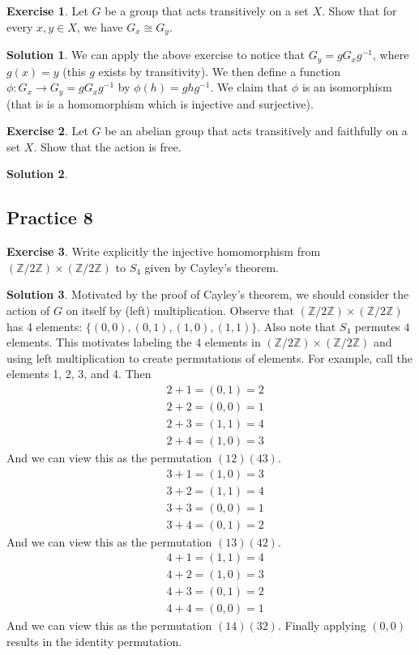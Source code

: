 \documentclass[12pt]{article}
\theoremstyle{definition}
\newcommand{\Z}{\mathbb{Z}}
\newtheorem{exercise}{\color{YellowOrange}Exercise}
\theoremstyle{definition}
\newtheorem{solution}{\color{Goldenrod}Solution}
\begin{document}
\begin{exercise}
	Let $G$ be a group that acts transitively on a set $X$. Show that for every $x,y \in X$, we have $G_x \cong G_y$. 
\end{exercise}
\begin{solution}
	We can apply the above exercise to notice that $G_y = gG_xg^{-1}$, where $g(x) = y$ (this $g$ exists by transitivity). We then define a function $\phi : G_x \to G_y = gG_xg^{-1}$ by $\phi(h) = ghg^{-1}$. We claim that $\phi$ is an isomorphism (that is is a homomorphism which is injective and surjective). 
\end{solution}

\begin{exercise}
Let $G$ be an abelian group that acts transitively and faithfully on a set $X$. Show that the action is free. 
\end{exercise}
\begin{solution}
\end{solution}

\subsection{Practice 8}
\begin{exercise}
	Write explicitly the injective homomorphism from $(\Z/2 \Z) \times (\Z/2 \Z)$ to $S_4$ given by Cayley's theorem. 
\end{exercise}
\begin{solution}
	Motivated by the proof of Cayley's theorem, we should consider the action of $G$ on itself by (left) multiplication. Observe that $(\Z/2 \Z) \times (\Z/2 \Z)$ has 4 elements: $\{(0,0),(0,1),(1,0),(1,1)\}$. Also note that $S_4$ permutes $4$ elements. This motivates labeling the $4$ elements in $(\Z/2 \Z) \times (\Z/2 \Z)$  and using left multiplication to create permutations of elements. For example, call the elements 1, 2, 3, and 4. Then
	\begin{align*}
	&2 + 1 = (0,1) = 2\\
	&2 + 2 = (0,0) = 1\\
	&2 + 3 = (1,1) = 4\\
	&2 + 4 = (1,0) = 3 
	\end{align*}
	And we can view this as the permutation $(12)(43)$.
	\begin{align*}
	&3 + 1 = (1,0) = 3\\
	&3 + 2 = (1,1) = 4\\
	&3 + 3 = (0,0) = 1\\
	&3 + 4 = (0,1) = 2 
	\end{align*}
	And we can view this as the permutation $(13)(42)$.
	\begin{align*}
	&4 + 1 = (1,1) = 4\\
	&4 + 2 = (1,0) = 3\\
	&4 + 3 = (0,1) = 2\\
	&4 + 4 = (0,0) = 1 
	\end{align*}
	And we can view this as the permutation $(14)(32)$. Finally applying $(0,0)$ results in the identity permutation. 
 \end{solution}
\end{document}
